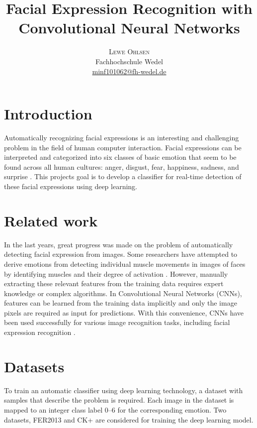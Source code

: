 \documentclass[twoside]{article}
\title{\vspace{-15mm}\fontsize{16pt}{10pt}\selectfont\textbf{Facial Expression Recognition with\\ Convolutional Neural Networks}} %
\author{
	\large
	\textsc{Lewe Ohlsen}\\[2mm] %
	\normalsize Fachhochschule Wedel \\ %
	\normalsize \href{mailto:minf101062@fh-wedel.de}{minf101062@fh-wedel.de} %
	\vspace{-5mm}
}
\date{}
\begin{document}
\maketitle %


\begin{multicols}{2} %

\section{Introduction}

Automatically recognizing facial expressions is an interesting and challenging problem in the field of human computer interaction. Facial expressions can be interpreted and categorized into six classes of basic emotion that seem to be found across all human cultures: anger, disgust, fear, happiness, sadness, and surprise \cite{ekman93}. This projects goal is to develop a classifier for real-time detection of these facial expressions using deep learning.


\section{Related work}
In the last years, great progress was made on the problem of automatically detecting facial expression from images. Some researchers have attempted to derive emotions from detecting individual muscle movements in images of faces by identifying muscles and their degree of activation \cite{lien98}. However, manually extracting these relevant features from the training data requires expert knowledge or complex algorithms. In Convolutional Neural Networks (CNNs), features can be learned from the training data implicitly and only the image pixels are required as input for predictions. With this convenience, CNNs have been used successfully for various image recognition tasks, including facial expression recognition \cite{dumas01}.

\section{Datasets}
To train an automatic classifier using deep learning technology, a dataset with samples that describe the problem is required. Each image in the dataset is mapped to an integer class label 0–6 for the corresponding emotion. Two datasets, FER2013 \cite{goodfel13} and CK+ \cite{cohn00} are considered for training the deep learning model.


\end{multicols}
\end{document}
